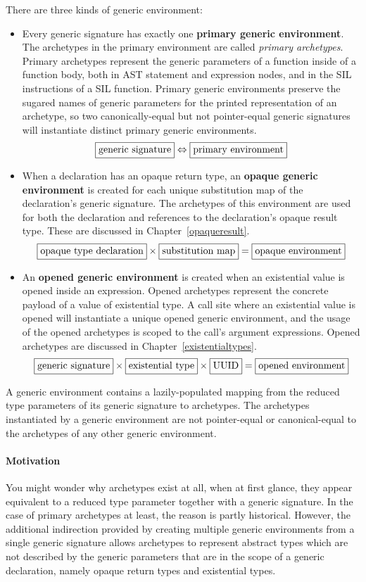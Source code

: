 \documentclass[a4paper,headsepline,bibliography=totoc,toc=flat,fleqn,twoside=semi]{scrbook}
\theoremstyle{definition}
\theoremstyle{definition}
\theoremstyle{definition}
\newcommand{\mathboxed}[1]{\boxed{\mbox{\vphantom{pI\texttt{pI}}#1}}}
\begin{document}
There are three kinds of generic environment:
\begin{itemize}
\item Every generic signature has exactly one \textbf{primary generic environment}. The archetypes in the primary environment are called \emph{primary archetypes}. Primary archetypes represent the generic parameters of a function inside of a function body, both in AST statement and expression nodes, and in the SIL instructions of a SIL function. Primary generic environments preserve the sugared names of generic parameters for the printed representation of an archetype, so two canonically-equal but not pointer-equal generic signatures will instantiate distinct primary generic environments.
\[\mathboxed{generic signature} \Leftrightarrow \mathboxed{primary environment}\]

\item When a declaration has an opaque return type, an \textbf{opaque generic environment} is created for each unique substitution map of the declaration's generic signature. The archetypes of this environment are used for both the declaration and references to the declaration's opaque result type. These are discussed in Chapter~\ref{opaqueresult}.
\[\mathboxed{opaque type declaration}\times\mathboxed{substitution map} = \mathboxed{opaque environment}\]

\item An \textbf{opened generic environment} is created when an existential value is opened inside an expression. Opened archetypes represent the concrete payload of a value of existential type. A call site where an existential value is opened will instantiate a unique opened generic environment, and the usage of the opened archetypes is scoped to the call's argument expressions. Opened archetypes are discussed in Chapter~\ref{existentialtypes}.
\[\mathboxed{generic signature} \times \mathboxed{existential type} \times \mathboxed{UUID} = \mathboxed{opened environment}\]
\end{itemize}

A generic environment contains a lazily-populated mapping from the reduced type parameters of its generic signature to archetypes. The archetypes instantiated by a generic environment are not pointer-equal or canonical-equal to the archetypes of any other generic environment.

\paragraph{Motivation} You might wonder why archetypes exist at all, when at first glance, they appear equivalent to a reduced type parameter together with a generic signature. In the case of primary archetypes at least, the reason is partly historical. However, the additional indirection provided by creating multiple generic environments from a single generic signature allows archetypes to represent abstract types which are not described by the generic parameters that are in the scope of a generic declaration, namely opaque return types and existential types.
\end{document}
